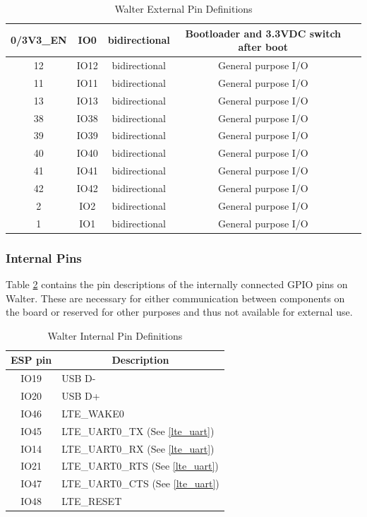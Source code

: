 \documentclass[11pt]{article}
\begin{document}
\begin{table}[!h]
\begin{center}
\begin{tabular}{|c|c|c|c|p{9.5cm}|}
\hline
0/3V3\_EN & IO0 & bidirectional & Bootloader and 3.3VDC switch after boot \\
\hline
12 & IO12 & bidirectional & General purpose I/O \\
\hline
11 & IO11 & bidirectional & General purpose I/O \\
\hline
13 & IO13 & bidirectional & General purpose I/O \\
\hline
38 & IO38 & bidirectional & General purpose I/O \\
\hline
39 & IO39 & bidirectional & General purpose I/O \\
\hline
40 & IO40 & bidirectional & General purpose I/O \\
\hline
41 & IO41 & bidirectional & General purpose I/O \\
\hline
42 & IO42 & bidirectional & General purpose I/O \\
\hline
2 & IO2 & bidirectional & General purpose I/O \\
\hline
1 & IO1 & bidirectional & General purpose I/O \\
\hline
\end{tabular}
\caption{\label{table_exteral_pin}Walter External Pin Definitions}
\end{center}
\end{table}
\newpage

\subsubsection{Internal Pins} \label{internal_pins}
Table \ref{table_interal_pin} contains the pin descriptions of the internally connected GPIO pins on Walter. These are necessary for either communication between components on the board or reserved for other purposes and thus not available for external use.

\begin{table}[!h]
    \centering
    \begin{tabular}{|c|p{9.5cm}|}
    \hline
    {\bf ESP pin} & \multicolumn{1}{c|}{\bf Description} \\
    \hline
    \hline
    IO19 & USB D-\\
    \hline
    IO20 & USB D+\\
    \hline
    IO46 & LTE\_WAKE0 \\
    \hline
    IO45 & LTE\_UART0\_TX (See \ref{lte_uart})\\
    \hline
    IO14 & LTE\_UART0\_RX (See \ref{lte_uart})\\
    \hline
    IO21 & LTE\_UART0\_RTS (See \ref{lte_uart})\\
    \hline
    IO47 & LTE\_UART0\_CTS (See \ref{lte_uart})\\
    \hline
    IO48 & LTE\_RESET\\
    \hline
    \end{tabular}
    \caption{\label{table_interal_pin}Walter Internal Pin Definitions}
\end{table}
\newpage
\end{document}
